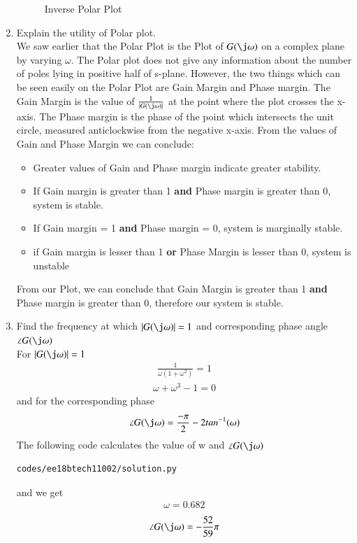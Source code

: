 \begin{enumerate}[label=\thesection.\arabic*.,ref=\thesection.\theenumi]
\begin{figure}
\caption{Inverse Polar Plot}
\label{fig:inverse_polar_plot}
\end{figure}
\item Explain the utility of Polar plot.
\\
\solution
We saw earlier that the Polar Plot is the Plot of $G(\j\omega)$ on a complex plane by varying $\omega$.
The Polar plot does not give any information about the number of poles lying in positive half of s-plane.
However, the two things which can be seen easily on the Polar Plot are Gain Margin and Phase margin.
The Gain Margin is the value of $\frac{1}{|G(\j\omega)|}$ at the point where the plot crosses the x-axis.
The Phase margin is the phase of the point which intersects the unit circle, measured anticlockwise from the negative x-axis.
From the values of Gain and Phase Margin we can conclude:
\begin{itemize}
\item Greater values of Gain and Phase margin indicate greater stability.
\item If Gain margin is greater than 1 \textbf{and} Phase margin is greater than 0, system is stable.
\item If Gain margin = 1 \textbf{and} Phase margin = 0, system is marginally stable. 
\item if Gain margin is lesser than 1 \textbf{or} Phase Margin is lesser than 0, system is unstable
\end{itemize}
From our Plot, we can conclude that Gain Margin is greater than 1 \textbf{and} Phase margin is greater than 0, therefore our system is stable. 
\item Find the frequency at which $|G(\j\omega)| = 1$ and corresponding phase angle $\angle G(\j\omega)$
\\
\solution 
For $|G(\j\omega)| = 1$
\begin{align}
\frac{1}{\omega(1+\omega^2)} = 1
\end{align}
\begin{align}
\omega + \omega^3 - 1 = 0
\end{align}
and for the corresponding phase
\begin{align}
\angle G(\j\omega) = \frac{-\pi}{2} - 2tan^{-1}(\omega)
\end{align}
The following code calculates the value of w and $\angle G(\j\omega)$
\begin{lstlisting}
codes/ee18btech11002/solution.py
\end{lstlisting}
%
and we get 
\begin{align}
\omega = 0.682
\end{align}
\begin{align}
\angle G(\j\omega)=-\frac{52}{59}\pi
\end{align}
\end{enumerate}
